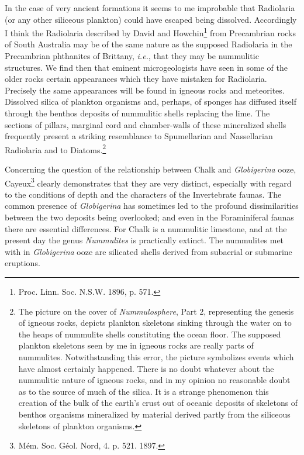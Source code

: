 \documentclass[a4paper, 12pt, oneside]{article}
\begin{document}
In the case of very ancient formations it seems to me improbable that Radiolaria (or any other siliceous plankton) could have escaped being dissolved. Accordingly I think the Radiolaria described by David and Howchin\footnote{Proc. Linn. Soc. N.S.W. 1896, p. 571.} from Precambrian rocks of South Australia may be of the same nature as the supposed Radiolaria in the Precambrian phthanites of Brittany, \emph{i.e.}, that they may be nummulitic structures. We find then that eminent microgeologists have seen in some of the older rocks certain appearances which they have mistaken for Radiolaria. Precisely the same appearances will be found in igneous rocks and meteorites. Dissolved silica of plankton organisms and, perhaps, of sponges has diffused itself through the benthos deposits of nummulitic shells replacing the lime. The sections of pillars, marginal cord and chamber-walls of these mineralized shells frequently present a striking resemblance to Spumellarian and Nassellarian Radiolaria and to Diatoms.\footnote{The picture on the cover of \emph{Nummulosphere}, Part 2, representing the genesis of igneous rocks, depicts plankton skeletons sinking through the water on to the heaps of nummulite shells constituting the ocean floor. The supposed plankton skeletons seen by me in igneous rocks are really parts of nummulites. Notwithstanding this error, the picture symbolizes events which have almost certainly happened. There is no doubt whatever about the nummulitic nature of igneous rocks, and in my opinion no reasonable doubt as to the source of much of the silica. It is a strange phenomenon this creation of the bulk of the earth's crust out of oceanic deposits of skeletons of benthos organisms mineralized by material derived partly from the siliceous skeletons of plankton organisms.}

Concerning the question of the relationship between Chalk and \emph{Globigerina} ooze, Cayeux\footnote{Mém. Soc. Géol. Nord, 4. p. 521. 1897.} clearly demonstrates that they are very distinct, especially with regard to the conditions of depth and the characters of the Invertebrate faunas. The common presence of \emph{Globigerina} has sometimes led to the profound dissimilarities between the two deposits being overlooked; and even in the Foraminiferal faunas there are essential differences. For Chalk is a nummulitic limestone, and at the present day the genus \emph{Nummulites} is practically extinct. The nummulites met with in \emph{Globigerina} ooze are silicated shells derived from subaerial or submarine eruptions.
\end{document}
